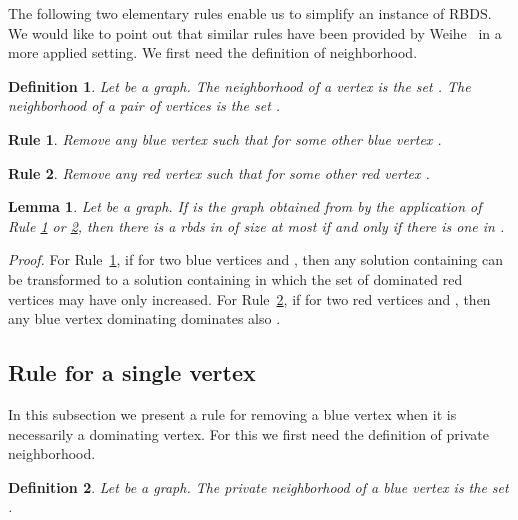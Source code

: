 \documentclass[a4paper,11pt]{article}
\newtheorem{lem}  {Lemma}
\newtheorem{rgl}  {Rule}
\newtheorem{defi} {Definition}
\newcommand{\rrgl}   [1] {Rule~\ref{#1}\xspace}
\newcommand{\drb}    [0] {rbds\xspace}
\newcommand{\RBDS}{\textsc{RBDS}\xspace}
\newenvironment{proof}{\noindent \textit{Proof. }}{\hfill\vspace{.2cm}}
\begin{document}
The following two elementary rules enable us to simplify an instance of \RBDS. We would like to point out that similar rules have been provided by Weihe~\cite{Wei98} in a more applied setting. We first need the definition of neighborhood.

\begin{defi}
Let  be a graph.
The \emph{neighborhood} of a vertex  is the set .
The \emph{neighborhood} of a pair of vertices  is the set .
\end{defi}



\begin{rgl}     \label{rgl_bleu}
Remove any blue vertex  such that  for some other blue vertex .
\end{rgl}

\begin{rgl}    \label{rgl_rouge}
Remove any red vertex  such that  for some other red vertex .
\end{rgl}

\begin{lem} \label{lem_corr_elem}
Let  be a graph.
If  is the graph obtained from  by the application of Rule \ref{rgl_bleu} or \ref{rgl_rouge}, then there is a \drb in  of size at most  if and only if there is one in .
\end{lem}

\begin{proof}
For \rrgl{rgl_bleu}, if  for two blue vertices  and , then any solution containing  can be transformed to a solution containing  in which the set of dominated red vertices may have only increased. For \rrgl{rgl_rouge}, if  for two red vertices  and , then any blue vertex dominating  dominates also .
\end{proof} 





\subsection{Rule for a single vertex} \label{Rsom}

In this subsection we present a rule for removing a blue vertex when it is necessarily a dominating vertex. For this we first need the definition of private neighborhood.

\begin{defi}
Let  be a graph.
The \emph{private neighborhood} of a blue vertex  is the set .
\end{defi}
\end{document}
